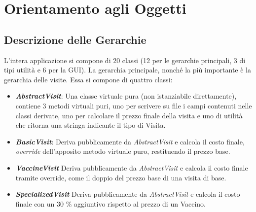 \chapter{Orientamento agli Oggetti} 
 
\section{Descrizione delle Gerarchie}

L'intera applicazione si compone di 20 classi (12 per le gerarchie principali, 3 di tipi utilità e 6 per la GUI).
La gerarchia principale, nonché la più importante è la gerarchia delle visite. Essa si compone di quattro classi:
\begin{itemize}
	\item \textit{\textbf{AbstractVisit}}: Una classe virtuale pura (non istanziabile direttamente), contiene 3 metodi virtuali puri, uno per scrivere su file i campi contenuti nelle classi derivate, uno per calcolare il prezzo finale della visita e uno di utilità che ritorna una stringa indicante il tipo di Visita.
	\item \textit{\textbf{BasicVisit}}: Deriva pubblicamente da \textit{AbstractVisit} e calcola il costo finale, \textit{override} dell'apposito metodo virtuale puro, restituendo il prezzo base.
	\item \textit{\textbf{VaccineVisit}} Deriva pubblicamente da \textit{AbstractVisit} e calcola il costo finale tramite override,  come il doppio del prezzo base di una visita di base.
	\item \textit{\textbf{SpecializedVisit}} Deriva pubblicamente da \textit{AbstractVisit} e calcola il costo finale con un 30 \% aggiuntivo rispetto al prezzo di un Vaccino.
\end{itemize} 

